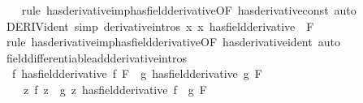 \begin{isabellebody}
%
\isadelimproof
\ \ %
\endisadelimproof
%
\isatagproof
{}\isamarkupfalse%
\ {\isacharparenleft}{\kern0pt}rule\ has{\isacharunderscore}{\kern0pt}derivative{\isacharunderscore}{\kern0pt}imp{\isacharunderscore}{\kern0pt}has{\isacharunderscore}{\kern0pt}field{\isacharunderscore}{\kern0pt}derivative{\isacharbrackleft}{\kern0pt}OF\ has{\isacharunderscore}{\kern0pt}derivative{\isacharunderscore}{\kern0pt}const{\isacharbrackright}{\kern0pt}{\isacharparenright}{\kern0pt}\ auto%
\endisatagproof
{\isafoldproof}%
%
\isadelimproof
\isanewline
%
\endisadelimproof
\isanewline
{}\isamarkupfalse%
\ DERIV{\isacharunderscore}{\kern0pt}ident\ {\isacharbrackleft}{\kern0pt}simp{\isacharcomma}{\kern0pt}\ derivative{\isacharunderscore}{\kern0pt}intros{\isacharbrackright}{\kern0pt}{\isacharcolon}{\kern0pt}\ {\isachardoublequoteopen}{\isacharparenleft}{\kern0pt}{\isacharparenleft}{\kern0pt}{\isasymlambda}x{\isachardot}{\kern0pt}\ x{\isacharparenright}{\kern0pt}\ has{\isacharunderscore}{\kern0pt}field{\isacharunderscore}{\kern0pt}derivative\ {}{\isacharparenright}{\kern0pt}\ F{\isachardoublequoteclose}\isanewline
%
\isadelimproof
\ \ %
\endisadelimproof
%
\isatagproof
{}\isamarkupfalse%
\ {\isacharparenleft}{\kern0pt}rule\ has{\isacharunderscore}{\kern0pt}derivative{\isacharunderscore}{\kern0pt}imp{\isacharunderscore}{\kern0pt}has{\isacharunderscore}{\kern0pt}field{\isacharunderscore}{\kern0pt}derivative{\isacharbrackleft}{\kern0pt}OF\ has{\isacharunderscore}{\kern0pt}derivative{\isacharunderscore}{\kern0pt}ident{\isacharbrackright}{\kern0pt}{\isacharparenright}{\kern0pt}\ auto%
\endisatagproof
{\isafoldproof}%
%
\isadelimproof
\isanewline
%
\endisadelimproof
\isanewline
{}\isamarkupfalse%
\ field{\isacharunderscore}{\kern0pt}differentiable{\isacharunderscore}{\kern0pt}add{\isacharbrackleft}{\kern0pt}derivative{\isacharunderscore}{\kern0pt}intros{\isacharbrackright}{\kern0pt}{\isacharcolon}{\kern0pt}\isanewline
\ \ {\isachardoublequoteopen}{\isacharparenleft}{\kern0pt}f\ has{\isacharunderscore}{\kern0pt}field{\isacharunderscore}{\kern0pt}derivative\ f{\isacharprime}{\kern0pt}{\isacharparenright}{\kern0pt}\ F\ {\isasymLongrightarrow}\ {\isacharparenleft}{\kern0pt}g\ has{\isacharunderscore}{\kern0pt}field{\isacharunderscore}{\kern0pt}derivative\ g{\isacharprime}{\kern0pt}{\isacharparenright}{\kern0pt}\ F\ {\isasymLongrightarrow}\isanewline
\ \ \ \ {\isacharparenleft}{\kern0pt}{\isacharparenleft}{\kern0pt}{\isasymlambda}z{\isachardot}{\kern0pt}\ f\ z\ {\isacharplus}{\kern0pt}\ g\ z{\isacharparenright}{\kern0pt}\ has{\isacharunderscore}{\kern0pt}field{\isacharunderscore}{\kern0pt}derivative\ f{\isacharprime}{\kern0pt}\ {\isacharplus}{\kern0pt}\ g{\isacharprime}{\kern0pt}{\isacharparenright}{\kern0pt}\ F{\isachardoublequoteclose}\isanewline

\end{isabellebody}
